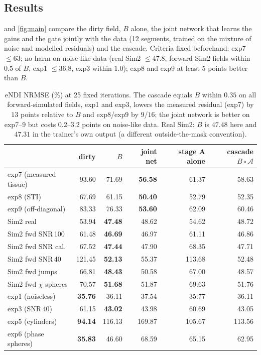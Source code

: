 \documentclass[11pt]{article}
\begin{document}
\subsection{Results}
 and \cref{fig:main} compare the dirty field, $B$ alone, the joint network that learns the gains and the gate jointly with the data (12 segments, trained on the mixture of noise and modelled residuals) and the cascade. Criteria fixed beforehand: exp7 $\le63$; no harm on noise-like data (real Sim2 $\le47.8$, forward Sim2 fields within $0.5$ of $B$, exp1 $\le36.8$, exp3 within $1.0$); exp8 and exp9 at least $5$ points better than $B$.
\begin{table}[h]\centering\small
\begin{tabular}{@{}lrrrrr@{}}
\toprule
 & dirty & $B$ & joint net & stage A alone & \textbf{cascade} $B\!\circ\!\mathcal A$ \\
\midrule
exp7 (measured tissue) & 93.60 & 71.69 & \textbf{56.58} & 61.37 & 58.63 \\
exp8 (STI) & 67.69 & 61.15 & \textbf{50.40} & 52.79 & 52.35 \\
exp9 (off-diagonal) & 83.33 & 76.33 & \textbf{53.60} & 62.09 & 60.46 \\
\midrule
Sim2 real & 53.94 & \textbf{47.48} & 48.62 & 54.62 & 48.72 \\
Sim2 fwd SNR\,100 & 61.48 & \textbf{46.69} & 46.97 & 61.11 & 46.86 \\
Sim2 fwd SNR cal. & 67.52 & \textbf{47.44} & 47.90 & 68.35 & 47.71 \\
Sim2 fwd SNR\,40 & 121.45 & \textbf{52.13} & 55.37 & 113.68 & 52.48 \\
Sim2 fwd jumps & 66.81 & \textbf{48.43} & 50.58 & 67.00 & 48.57 \\
Sim2 fwd $\chi$ spheres & 70.57 & \textbf{51.68} & 51.87 & 69.63 & 51.76 \\
exp1 (noiseless) & \textbf{35.76} & 36.11 & 37.54 & 35.77 & 36.11 \\
exp3 (SNR\,40) & 61.15 & \textbf{43.02} & 43.98 & 60.69 & 43.05 \\
\midrule
exp5 (cylinders) & \textbf{94.14} & 116.13 & 169.87 & 105.67 & 113.56 \\
exp6 (phase spheres) & \textbf{35.83} & 46.60 & 68.59 & 65.15 & 62.95 \\
\bottomrule
\end{tabular}
\caption{eNDI NRMSE (\%) at 25 fixed iterations. The cascade equals $B$ within $0.35$ on all forward-simulated fields, exp1 and exp3, lowers the measured residual (exp7) by $13$ points relative to $B$ and exp8/exp9 by $9$/$16$; the joint network is better on exp7--9 but costs $0.2$--$3.2$ points on noise-like data. Real Sim2: $B$ is $47.48$ here and $47.31$ in the trainer's own output (a different outside-the-mask convention).}\label{tab:main}
\end{table}
\end{document}
